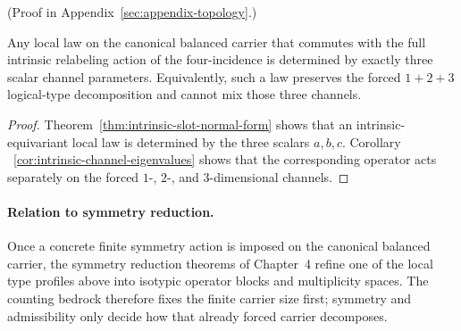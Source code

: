 (Proof in Appendix~\ref{sec:appendix-topology}.)

\begin{corollary}
\label{cor:intrinsic-equivariant-three-parameter}
Any local law on the canonical balanced carrier that commutes with the full
intrinsic relabeling action of the four-incidence is determined by exactly
three scalar channel parameters. Equivalently, such a law preserves the forced
$1+2+3$ logical-type decomposition and cannot mix those three channels.
\end{corollary}

\begin{proof}
Theorem~\ref{thm:intrinsic-slot-normal-form} shows that an intrinsic-equivariant
local law is determined by the three scalars $a,b,c$. Corollary
~\ref{cor:intrinsic-channel-eigenvalues} shows that the corresponding operator
acts separately on the forced $1$-, $2$-, and $3$-dimensional channels.
\end{proof}

\paragraph{Relation to symmetry reduction.}
\label{rem:type-profile-symmetry-reduction}
Once a concrete finite symmetry action is imposed on the canonical balanced
carrier, the symmetry reduction theorems of Chapter~4 refine one of the local
type profiles above into isotypic operator blocks and multiplicity spaces.
The counting bedrock therefore fixes the finite carrier size first; symmetry
and admissibility only decide how that already forced carrier decomposes.
